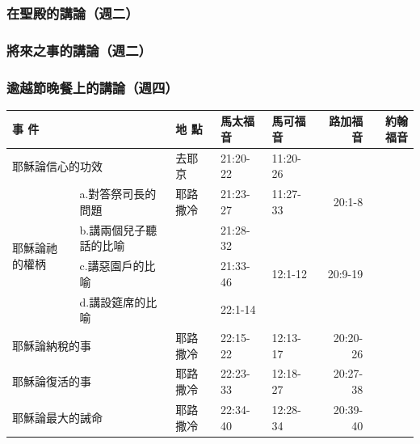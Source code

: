 \subsubsection{在聖殿的講論（週二）}
\subsubsection{將來之事的講論（週二）}
\subsubsection{逾越節晚餐上的講論（週四）}

\begin{table}[htbp]
  \centering 
    \begin{tabular}{|p{4.57em}l|p{4.43em}|p{4.215em}|p{4.355em}|r|r|}
    \toprule
    \multicolumn{2}{|p{15.285em}|}{\textbf{事 件}} & \textbf{地 點} & \textbf{馬太福音} & \textbf{馬可福音} & \multicolumn{1}{p{4.em}|}{\textbf{路加福音}} & \multicolumn{1}{p{4.em}|}{\textbf{約翰福音}} \\
    \midrule
    \multicolumn{2}{|p{17.285em}|}{耶穌論信心的功效} & 去耶京   & 21:20-22 & 11:20-26 &       &  \\
    \midrule
    \multicolumn{1}{|l|}{\multirow{4}{*}{\parbox{0.08\textwidth}{耶穌論祂的權柄}}} & \multicolumn{1}{p{12.715em}|}{a.對答祭司長的問題} & 耶路撒冷  & 21:23-27 & 11:27-33 & \multicolumn{1}{p{5.145em}|}{20:1-8} &  \\
\cmidrule{2-7}    \multicolumn{1}{|l|}{} & \multicolumn{1}{p{12.715em}|}{b.講兩個兒子聽話的比喻} & \multicolumn{1}{r|}{} & 21:28-32 & \multicolumn{1}{r|}{} &       &  \\
\cmidrule{2-7}    \multicolumn{1}{|l|}{} & \multicolumn{1}{p{12.715em}|}{c.講惡園戶的比喻} & \multicolumn{1}{r|}{} & 21:33-46 & 12:1-12 & \multicolumn{1}{p{5.145em}|}{20:9-19} &  \\
\cmidrule{2-7}    \multicolumn{1}{|l|}{} & \multicolumn{1}{p{12.715em}|}{d.講設筵席的比喻} & \multicolumn{1}{r|}{} & 22:1-14 & \multicolumn{1}{r|}{} &       &  \\
    \midrule
    \multicolumn{2}{|p{17.285em}|}{耶穌論納稅的事} & 耶路撒冷  & 22:15-22 & 12:13-17 & \multicolumn{1}{p{5.145em}|}{20:20-26} &  \\
    \midrule
    \multicolumn{2}{|p{17.285em}|}{耶穌論復活的事} & 耶路撒冷  & 22:23-33 & 12:18-27 & \multicolumn{1}{p{5.145em}|}{20:27-38} &  \\
    \midrule
    \multicolumn{2}{|p{17.285em}|}{耶穌論最大的誡命} & 耶路撒冷  & 22:34-40 & 12:28-34 & \multicolumn{1}{p{5.145em}|}{20:39-40} &  \\

\end{tabular}
\end{table}

